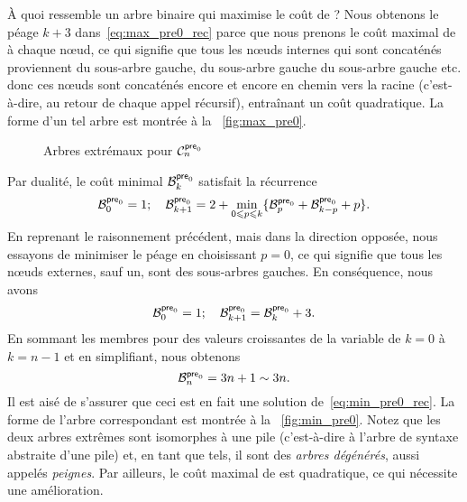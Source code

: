 À quoi ressemble un arbre binaire qui maximise le coût de
? Nous obtenons le
péage \(k+3\) dans~\eqref{eq:max_pre0_rec} parce que nous prenons le
coût maximal de  à chaque nœud,
ce qui signifie que tous les nœuds internes qui sont concaténés
proviennent du sous-arbre gauche, du sous-arbre gauche du sous-arbre
gauche etc. donc ces nœuds sont concaténés encore et encore en
chemin vers la racine (c'est-à-dire, au retour de chaque appel
récursif), entraînant un coût quadratique. La forme d'un tel arbre est
montrée à la \fig~\vref{fig:max_pre0}.
\begin{figure}[b]
\centering
{}
\qquad
{}
\caption{Arbres extrémaux pour \(\C{\fun{pre}_0}{n}\)}
\label{fig:tree_stack}
\end{figure}

Par dualité, le coût minimal
\(\B{\fun{pre}_0}{k}\) satisfait la
récurrence
\begin{equation*}
\B{\fun{pre}_0}{0} = 1;\quad
\B{\fun{pre}_0}{k+1} =
  2 + \min_{0 \leqslant p \leqslant k}\{\B{\fun{pre}_0}{p}
                                  + \B{\fun{pre}_0}{k-p} + p\}.
\end{equation*}
En reprenant le raisonnement précédent, mais dans la direction
opposée, nous essayons de minimiser le péage en choisissant \(p=0\),
ce qui signifie que tous les nœuds externes, sauf un, sont des
sous-arbres gauches. En conséquence, nous avons
\begin{equation}
\B{\fun{pre}_0}{0} = 1;\quad
\B{\fun{pre}_0}{k+1} = \B{\fun{pre}_0}{k} + 3.
\label{eq:min_pre0_rec}
\end{equation}
En sommant les membres pour des valeurs croissantes de la variable de
\(k=0\) à \(k=n-1\) et en simplifiant, nous obtenons
\begin{equation*}
\B{\fun{pre}_0}{n} = 3n + 1 \sim 3n.
\end{equation*}
Il est aisé de s'assurer que ceci est en fait une solution
de~\eqref{eq:min_pre0_rec}. La forme de l'arbre correspondant est
montrée à la \fig~\vref{fig:min_pre0}. Notez que les deux arbres
extrêmes sont isomorphes à une pile (c'est-à-dire à l'arbre de syntaxe
abstraite d'une pile) et, en
tant que tels, il sont des \emph{arbres dégénérés}, aussi appelés
\emph{peignes}. Par ailleurs, le
coût maximal de  est
quadratique, ce qui nécessite une amélioration.

